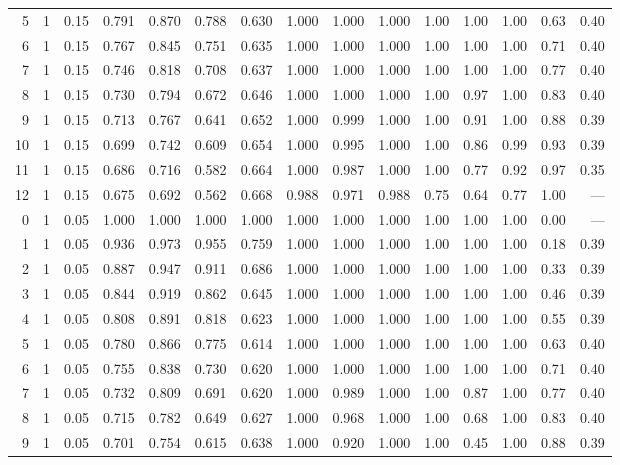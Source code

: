 \begin{landscape}
\begin{longtable}{rrrrrrrrrrrrrrr}
5 & 1 & 0.15 & 0.791 & 0.870 & 0.788 & 0.630 & 1.000 & 1.000 & 1.000 & 1.00 & 1.00 & 1.00 & 0.63 & 0.40 \\
6 & 1 & 0.15 & 0.767 & 0.845 & 0.751 & 0.635 & 1.000 & 1.000 & 1.000 & 1.00 & 1.00 & 1.00 & 0.71 & 0.40 \\
7 & 1 & 0.15 & 0.746 & 0.818 & 0.708 & 0.637 & 1.000 & 1.000 & 1.000 & 1.00 & 1.00 & 1.00 & 0.77 & 0.40 \\
8 & 1 & 0.15 & 0.730 & 0.794 & 0.672 & 0.646 & 1.000 & 1.000 & 1.000 & 1.00 & 0.97 & 1.00 & 0.83 & 0.40 \\
9 & 1 & 0.15 & 0.713 & 0.767 & 0.641 & 0.652 & 1.000 & 0.999 & 1.000 & 1.00 & 0.91 & 1.00 & 0.88 & 0.39 \\
10 & 1 & 0.15 & 0.699 & 0.742 & 0.609 & 0.654 & 1.000 & 0.995 & 1.000 & 1.00 & 0.86 & 0.99 & 0.93 & 0.39 \\
11 & 1 & 0.15 & 0.686 & 0.716 & 0.582 & 0.664 & 1.000 & 0.987 & 1.000 & 1.00 & 0.77 & 0.92 & 0.97 & 0.35 \\
12 & 1 & 0.15 & 0.675 & 0.692 & 0.562 & 0.668 & 0.988 & 0.971 & 0.988 & 0.75 & 0.64 & 0.77 & 1.00 & --- \\
\midrule
0 & 1 & 0.05 & 1.000 & 1.000 & 1.000 & 1.000 & 1.000 & 1.000 & 1.000 & 1.00 & 1.00 & 1.00 & 0.00 & --- \\
1 & 1 & 0.05 & 0.936 & 0.973 & 0.955 & 0.759 & 1.000 & 1.000 & 1.000 & 1.00 & 1.00 & 1.00 & 0.18 & 0.39 \\
2 & 1 & 0.05 & 0.887 & 0.947 & 0.911 & 0.686 & 1.000 & 1.000 & 1.000 & 1.00 & 1.00 & 1.00 & 0.33 & 0.39 \\
3 & 1 & 0.05 & 0.844 & 0.919 & 0.862 & 0.645 & 1.000 & 1.000 & 1.000 & 1.00 & 1.00 & 1.00 & 0.46 & 0.39 \\
4 & 1 & 0.05 & 0.808 & 0.891 & 0.818 & 0.623 & 1.000 & 1.000 & 1.000 & 1.00 & 1.00 & 1.00 & 0.55 & 0.39 \\
5 & 1 & 0.05 & 0.780 & 0.866 & 0.775 & 0.614 & 1.000 & 1.000 & 1.000 & 1.00 & 1.00 & 1.00 & 0.63 & 0.40 \\
6 & 1 & 0.05 & 0.755 & 0.838 & 0.730 & 0.620 & 1.000 & 1.000 & 1.000 & 1.00 & 1.00 & 1.00 & 0.71 & 0.40 \\
7 & 1 & 0.05 & 0.732 & 0.809 & 0.691 & 0.620 & 1.000 & 0.989 & 1.000 & 1.00 & 0.87 & 1.00 & 0.77 & 0.40 \\
8 & 1 & 0.05 & 0.715 & 0.782 & 0.649 & 0.627 & 1.000 & 0.968 & 1.000 & 1.00 & 0.68 & 1.00 & 0.83 & 0.40 \\
9 & 1 & 0.05 & 0.701 & 0.754 & 0.615 & 0.638 & 1.000 & 0.920 & 1.000 & 1.00 & 0.45 & 1.00 & 0.88 & 0.39 \\

\end{longtable}
\end{landscape}
